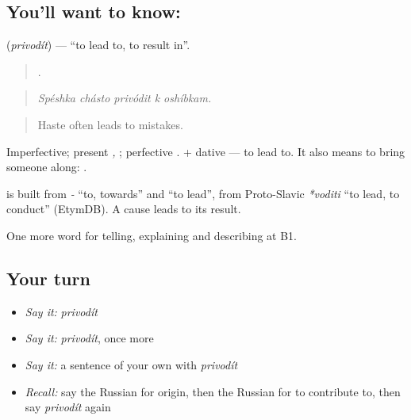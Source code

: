 \subsection*{You'll want to know: }
\textbf{} (\emph{privodít}) — \textquotedblleft{}to lead to, to result in\textquotedblright{}.

\begin{quote}
    .
\end{quote}

\begin{quote}
\emph{Spéshka chásto privódit k oshíbkam.}
\end{quote}

\begin{quote}
Haste often leads to mistakes.
\end{quote}

Imperfective; present \emph{, }; perfective \emph{}. \emph{ } + dative — to lead to. It also means to bring someone along: \emph{ }.

\begin{cousinweb}
\textbf{} is built from \emph{-} \textquotedblleft{}to, towards\textquotedblright{} and \emph{} \textquotedblleft{}to lead\textquotedblright{}, from Proto-Slavic \emph{*voditi} \textquotedblleft{}to lead, to conduct\textquotedblright{} (EtymDB). A cause leads to its result.
\end{cousinweb}

\begin{grammarlens}[title={What you've built}]
One more word for telling, explaining and describing at B1.
\end{grammarlens}

\subsection*{Your turn}
\begin{itemize}
\raggedright
  \item \emph{Say it:} \emph{privodít}
  \item \emph{Say it:} \emph{privodít}, once more
  \item \emph{Say it:} a sentence of your own with \emph{privodít}
  \item \emph{Recall:} say the Russian for origin, then the Russian for to contribute to, then say \emph{privodít} again
\end{itemize}

